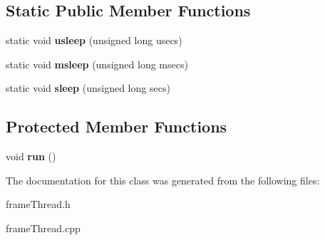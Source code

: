 \subsection*{Static Public Member Functions}
\begin{DoxyCompactItemize}
\item 
\mbox{\label{class_frame_thread_af15b98f08d8a1ef3f50b3d104c1c6480}} 
static void {\bfseries usleep} (unsigned long usecs)
\item 
\mbox{\label{class_frame_thread_afc09a4dccf48df22ad59b326aee352bd}} 
static void {\bfseries msleep} (unsigned long msecs)
\item 
\mbox{\label{class_frame_thread_a65fc75d57b3f490f20f0bc02815b6f39}} 
static void {\bfseries sleep} (unsigned long secs)
\end{DoxyCompactItemize}
\subsection*{Protected Member Functions}
\begin{DoxyCompactItemize}
\item 
\mbox{\label{class_frame_thread_a9efe242632d25b5e6f54f6319567a7ad}} 
void {\bfseries run} ()
\end{DoxyCompactItemize}


The documentation for this class was generated from the following files\+:\begin{DoxyCompactItemize}
\item 
frame\+Thread.\+h\item 
frame\+Thread.\+cpp\end{DoxyCompactItemize}
